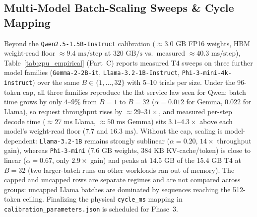 \documentclass[conference]{IEEEtran}
\begin{document}
\subsection{Multi-Model Batch-Scaling Sweeps \& Cycle Mapping}
Beyond the \texttt{Qwen2.5-1.5B-Instruct} calibration ($\approx 3.0\text{ GB}$ FP16 weights, HBM weight-read floor $\approx 9.4\text{ ms/step}$ at $320\text{ GB/s}$ vs.\ measured $\approx 40.3\text{ ms/step}$), Table~\ref{tab:gpu_empirical} (Part~C) reports measured T4 sweeps on three further model families (\texttt{Gemma-2-2B-it}, \texttt{Llama-3.2-1B-Instruct}, \texttt{Phi-3-mini-4k-instruct}) over the same $B \in \{1, \dots, 32\}$ with 5--10 trials per size. Under the 96-token cap, all three families reproduce the flat service law seen for Qwen: batch time grows by only $4\text{--}9\%$ from $B{=}1$ to $B{=}32$ ($\alpha{=}0.012$ for Gemma, $0.022$ for Llama), so request throughput rises by $\approx 29\text{--}31\times$, and measured per-step decode time ($\approx 27\text{ ms}$ Llama, $\approx 50\text{ ms}$ Gemma) sits $3.1\text{--}4.3\times$ above each model's weight-read floor ($7.7$ and $16.3\text{ ms}$). Without the cap, scaling is model-dependent: \texttt{Llama-3.2-1B} remains strongly sublinear ($\alpha{=}0.20$, $14\times$ throughput gain), whereas \texttt{Phi-3-mini} ($7.6\text{ GB}$ weights, $384\text{ KB}$ KV-cache/token) is close to linear ($\alpha{=}0.67$, only $2.9\times$ gain) and peaks at $14.5\text{ GB}$ of the $15.4\text{ GB}$ T4 at $B{=}32$ (two larger-batch runs on other workloads ran out of memory). The capped and uncapped rows are separate regimes and are not compared across groups: uncapped Llama batches are dominated by sequences reaching the 512-token ceiling. Finalizing the physical \texttt{cycle\_ms} mapping in \texttt{calibration\_parameters.json} is scheduled for Phase~3.
\end{document}
